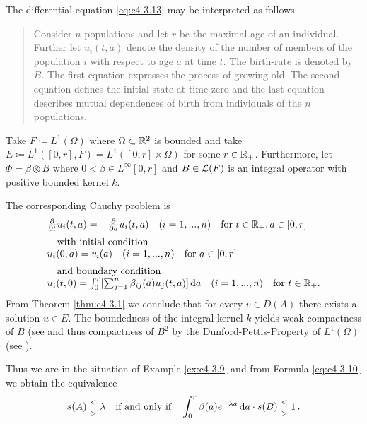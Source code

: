 The differential equation \eqref{eq:c4-3.13} may be interpreted as follows.
\begin{quote}
Consider $n$ populations and let $r$ be the maximal age of an individual.
Further let $u_{i}(t,a)$ denote the density of the number of members of the population $i$ with respect to age $a$ at time $t$.
The birth-rate is denoted by $B$.
The first equation expresses the process of growing old.
The second equation defines the initial state at time zero and the last equation describes mutual dependences of birth from individuals of the $n$ populations.
\end{quote}
\begin{example}\label{ex:c4-3.13}
%
Take $F \coloneqq L^{1}(\Omega)$ where $\Omega \subset \mathbb{R}^{2}$ is bounded and take \\ $E \coloneqq L^{1}([0,r], F) = L^{1}([0,r] \times \Omega)$ for some $r \in \mathbb{R}_{+}$.
Furthermore, let $\Phi = \beta \otimes B$ where $0 < \beta \in L^{\infty}[0,r]$ and $B \in \mathcal{L}(F)$ is an integral operator with positive bounded kernel $k$.

The corresponding Cauchy problem is
\begin{equation} \label{eq:c4-3.14}
\begin{array}{l}
\frac{\partial}{\partial t}u_i(t,a) = - \frac{\partial}{\partial a}u_i(t,a) \quad (i=1,...,n) \quad \text{for } t\in\mathbb{R}_+, a\in[0,r]\\[2mm]
\quad \text{with initial condition} \\
u_i(0,a) = v_i(a) \quad (i=1,...,n) \quad \text{for } a\in[0,r] \\[2mm]
\quad \text{and boundary condition} \\
u_i(t,0) = \int_0^r [\sum_{j=1}^n \beta_{ij}(a)u_j(t,a)]\mathop{}\!\mathrm{d}{a} \quad (i=1,...,n) \quad \text{for } t\in\mathbb{R}_+.
\end{array}
\end{equation}
From Theorem \ref{thm:c4-3.1} we conclude that for every $v \in D(A)$ there exists a solution $u \in E$.
The boundedness of the integral kernel $k$ yields weak compactness of $B$ (see \citet[Section II.5]{schaefer:1974} and thus compactness of $B^{2}$ by the Dunford-Pettis-Property of $L^{1}(\Omega)$ (see \citet[Chapter II, Theorem.9.9]{schaefer:1974}).

Thus we are in the situation of Example \ref{ex:c4-3.9} and from Formula \eqref{eq:c4-3.10} we obtain the equivalence
\[
s(A) \overset{<}{ \underset{>}{=} } \lambda \quad \text{if and only if} \quad \int_{0}^{r} \beta(a)e^{-\lambda a} \mathop{}\!\mathrm{d}{a} \cdot s(B) \overset{<}{ \underset{>}{=} } 1\,.
\]
\end{example}
